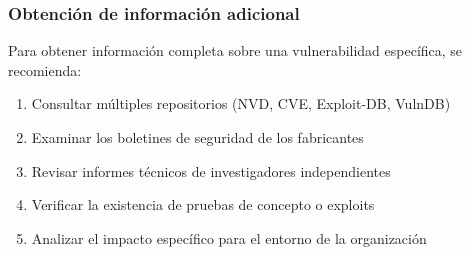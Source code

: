 {%




\subsubsection{Obtención de información adicional}

Para obtener información completa sobre una vulnerabilidad específica, se recomienda:

\begin{enumerate}
    \item Consultar múltiples repositorios (NVD, CVE, Exploit-DB, VulnDB)
    \item Examinar los boletines de seguridad de los fabricantes
    \item Revisar informes técnicos de investigadores independientes
    \item Verificar la existencia de pruebas de concepto o exploits
    \item Analizar el impacto específico para el entorno de la organización
\end{enumerate}

}
